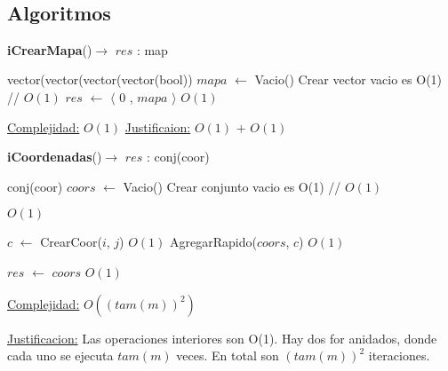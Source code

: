 $ $\newline
$ $\newline

\begin{Algoritmos}
\subsection{Algoritmos}

\begin{algorithm}[H]
{\textbf{iCrearMapa}()$\to$ $res$ : map}
\begin{algorithmic}[1]
   
\State vector(vector(vector(vector(bool)) $mapa$ $\gets$ Vacio()    \Comment Crear vector vacio es O(1) // $O(1)$
\State $res$ $\gets$  $\langle$ 0 , $mapa$ $\rangle$   \Comment $O(1)$

\medskip
\Statex \underline{Complejidad:} $O(1)$
\State \underline{Justificaion:} $O(1)$ $+$ $O(1)$

\end{algorithmic}
\end{algorithm}

\begin{algorithm}[H]
{\textbf{iCoordenadas}()$\to$ $res$ : conj(coor)}
\begin{algorithmic}[1]
   

\State conj(coor) $coors$ $\gets$ Vacio()      \Comment Crear conjunto vacio es O(1) // $O(1)$

	
		
		  \Comment $O(1)$
			
			\State $c$ $\gets$ CrearCoor($i$, $j$)   \Comment $O(1)$			
			\State AgregarRapido($coors$, $c$)   \Comment $O(1)$			
			
		\EndIf
		
	\EndFor

\EndFor

\State $res$ $\gets$ $coors$ \Comment $O(1)$


\medskip
\Statex \underline{Complejidad:} $O((tam(m))^2)$

\Statex \underline{Justificacion:} Las operaciones interiores son O(1). Hay dos for anidados, donde cada uno se ejecuta $tam(m)$ veces. En total son $(tam(m))^2$ iteraciones. 

\end{algorithmic}
\end{algorithm}


\end{Algoritmos}
